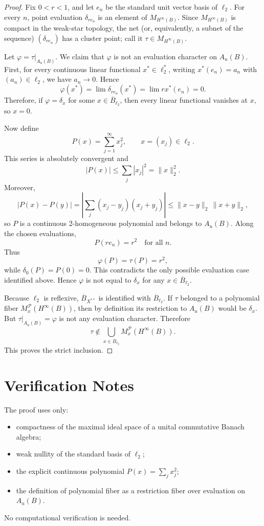 \documentclass[11pt]{article}
\newcommand{\Ball}{B}
\newcommand{\Au}{A_u}
\newcommand{\Hinfty}{H^\infty}
\newcommand{\M}{M}
\newcommand{\PP}{\mathcal P}
\begin{document}
\begin{proof}
Fix \(0<r<1\), and let \(e_n\) be the standard unit vector basis of
\(\ell_2\).  For every \(n\), point evaluation
\(\delta_{r e_n}\) is an element of \(\M_{\Hinfty(\Ball)}\).  Since
\(\M_{\Hinfty(\Ball)}\) is compact in the weak-star topology, the net (or,
equivalently, a subnet of the sequence) \((\delta_{r e_n})\) has a cluster
point; call it \(\tau\in \M_{\Hinfty(\Ball)}\).

Let \(\varphi=\tau|_{\Au(\Ball)}\).  We claim that \(\varphi\) is not an
evaluation character on \(\Au(\Ball)\).  First, for every continuous linear
functional \(x^*\in \ell_2^*\), writing \(x^*(e_n)=a_n\) with
\((a_n)\in \ell_2\), we have \(a_n\to 0\).  Hence
\[
  \varphi(x^*)
  =
  \lim \delta_{r e_n}(x^*)
  =
  \lim r x^*(e_n)
  =
  0.
\]
Therefore, if \(\varphi=\delta_x\) for some \(x\in \overline{\Ball}_{\ell_2}\),
then every linear functional vanishes at \(x\), so \(x=0\).

Now define
\[
  P(x)=\sum_{j=1}^{\infty} x_j^2,\qquad x=(x_j)\in \ell_2 .
\]
This series is absolutely convergent and
\[
  |P(x)|\leq \sum_j |x_j|^2=\|x\|_2^2.
\]
Moreover,
\[
  |P(x)-P(y)|
  =
  \left|\sum_j (x_j-y_j)(x_j+y_j)\right|
  \leq
  \|x-y\|_2\,\|x+y\|_2 ,
\]
so \(P\) is a continuous 2-homogeneous polynomial and belongs to
\(\Au(\Ball)\).  Along the chosen evaluations,
\[
  P(r e_n)=r^2 \quad\text{for all } n.
\]
Thus
\[
  \varphi(P)=\tau(P)=r^2,
\]
while \(\delta_0(P)=P(0)=0\).  This contradicts the only possible evaluation
case identified above.  Hence \(\varphi\) is not equal to \(\delta_x\) for any
\(x\in \overline{\Ball}_{\ell_2}\).

Because \(\ell_2\) is reflexive, \(\overline{\Ball}_{X^{**}}\) is identified
with \(\overline{\Ball}_{\ell_2}\).  If \(\tau\) belonged to a polynomial fiber
\(\M_x^{\PP}(\Hinfty(\Ball))\), then by definition its restriction to
\(\Au(\Ball)\) would be \(\delta_x\).  But \(\tau|_{\Au(\Ball)}=\varphi\) is
not any evaluation character.  Therefore
\[
  \tau\notin
  \bigcup_{x\in \overline{\Ball}_{\ell_2}}
  \M_x^{\PP}(\Hinfty(\Ball)).
\]
This proves the strict inclusion.
\end{proof}

\section*{Verification Notes}

The proof uses only:
\begin{itemize}
  \item compactness of the maximal ideal space of a unital commutative Banach
  algebra;
  \item weak nullity of the standard basis of \(\ell_2\);
  \item the explicit continuous polynomial \(P(x)=\sum_j x_j^2\);
  \item the definition of polynomial fiber as a restriction fiber over
  evaluation on \(\Au(\Ball)\).
\end{itemize}
No computational verification is needed.
\end{document}
